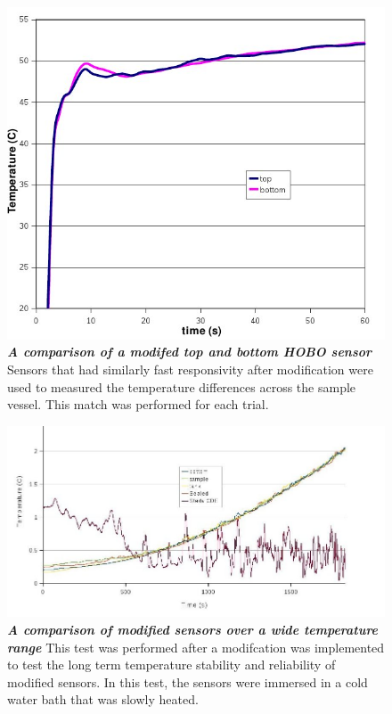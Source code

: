 \begin{center}
\begin{figure}[h!]
 \vspace{25mm}
 \centering\includegraphics[scale=0.6]{sensorComp1.jpg}
 \caption[Sensor Responsivity]{\textbf{\emph{A comparison of a modifed top and bottom HOBO sensor}} Sensors that had similarly fast responsivity after modification were used to measured the temperature differences across the sample vessel. This match was performed for each trial.\label{sensComp}}
\end{figure}
\end{center}

\begin{landscape}
\begin{center}
\begin{figure}
 \centering\includegraphics[scale=0.6]{sensorComp2.jpg}
 \caption[Sensor Comparison]{\textbf{\emph{A comparison of modified sensors over a wide temperature range}} This test was performed after a modifcation was implemented to test the long term temperature stability and reliability of modified sensors. In this test, the sensors were immersed in a cold water bath that was slowly heated.\label{sensComp2}}
\end{figure}
\end{center}
\end{landscape}

